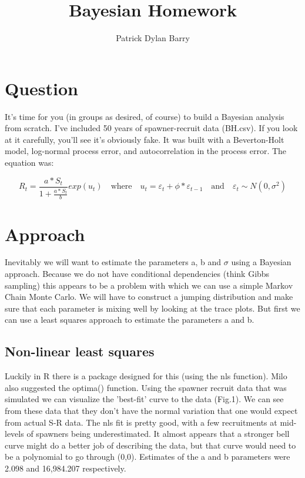 \documentclass{article}
\begin{document}
\title{Bayesian Homework}
\author{Patrick Dylan Barry}

\maketitle

\section{Question}
It's time for you (in groups as desired, of course) to build a Bayesian analysis from scratch. I've included 50 years of spawner-recruit data (BH.csv). If you look at it carefully, you'll see it's obviously fake. It was built with a Beverton-Holt model, log-normal process error, and autocorrelation in the process error. The equation was:

\begin{equation}
   R_t = \frac{a*S_t}{1+\frac{a*S_t}{b}}  exp(u_t)
   \quad\text{where}\quad
   u_t = \varepsilon_t + \phi*\varepsilon_{t-1}
   \quad\text{and}\quad
   \varepsilon_t \sim N(0,\sigma^2)
\end{equation}


\section{Approach}
Inevitably we will want to estimate the parameters a, b and $\sigma$ using a Bayesian approach. Because we do not have conditional dependencies (think Gibbs sampling) this appears to be a problem with which we can use a simple Markov Chain Monte Carlo. We will have to construct a jumping distribution and make sure that each parameter is mixing well by looking at the trace plots. But first we can use a least squares approach to estimate the parameters a and b.

\subsection{Non-linear least squares}
Luckily in R there is a package designed for this (using the nls function). Milo also suggested the optima() function. Using the spawner recruit data that was simulated we can visualize the 'best-fit' curve to the data (Fig.1). We can see from these data that they don't have the normal variation that one would expect from actual S-R data. The nls fit is pretty good, with a few recruitments at mid-levels of spawners being underestimated. It almost appears that a stronger bell curve might do a better job of describing the data, but that curve would need to be a polynomial to go through (0,0). Estimates of the a and b parameters were 2.098 and 16,984.207 respectively. 
\end{document}
